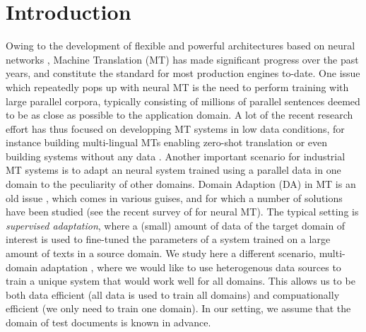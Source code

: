 \documentclass[11pt,a4paper]{article}
\begin{document}
\section{Introduction \label{sec:introduction}}
Owing to the development of flexible and powerful architectures based on neural networks \cite{Cho14properties,bahdanau2014neural,Ghering17convolutional,Vaswani17attention}, Machine Translation (MT) has made significant progress over the past years, and constitute the standard for most production engines to-date. One issue which repeatedly pops up with neural MT is the need to perform training with large parallel corpora, typically consisting of millions of parallel sentences deemed to be as close as possible to the application domain. A lot of the recent research effort has thus focused on developping MT systems in low data conditions, for instance building multi-lingual MTs enabling zero-shot translation\cite{Firat16multiway,Johnson17google} or even building systems without any data \cite{Artetxe18unsupervised,Lample18unsupervised}.
Another important scenario for industrial MT systems is to adapt an neural system trained using a parallel data in one  domain to the peculiarity of other domains. Domain Adaption (DA) in MT is an old issue \cite{Foster07mixture,Axelrod11domain}, which comes in various guises, and for which a number of solutions have been studied (see the recent survey of \cite{Chu18asurvey} for neural MT). The typical setting is \emph{supervised adaptation}, where a (small) amount of data of the target domain of interest is used to fine-tuned the parameters of a system trained on a large amount of texts in a source domain. We study here a different scenario, multi-domain adaptation \cite{Farajian17multidomain}, where we would like to use heterogenous data sources to train a unique system that would work well for all domains. This allows us to be both data efficient (all data is used to train all domains) and compuationally efficient (we only need to train one domain). In our setting, we assume that the domain of test documents is known in advance.
\end{document}
